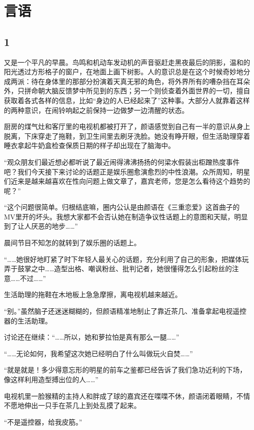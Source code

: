 \documentclass[UTF8, scheme = chinese, openany]{ctexbook}
\begin{document}
\section{言语}

\subsection{1}

又是一个平凡的早晨。鸟鸣和机动车发动机的声音驱赶走黑夜最后的阴影，温和的阳光透过方形格子的窗户，在地面上画下树影。人的意识总是在这个时候奇妙地分成两派：待在身体里的那部分扮演着天真无邪的角色，将外界所有的嘈杂挡在耳朵外，只拼命朝大脑反馈梦中所见到的东西；另一个则侦查着外面世界的一切，擅自获取着各式各样的信息，比如“身边的人已经起来了”这种事。大部分人就靠着这样的两种意识，在闹铃响起之前保持一边做梦一边清醒的状态。

厨房的煤气灶和客厅里的电视机都被打开了，颜语感觉到自己有一半的意识从身上脱离，下床穿走了拖鞋，到卫生间里去刷牙洗脸。她没有睁开眼，但生活助理穿着睡衣拿起牛奶盒检查保质日期的样子却出现在了脑海中。

“观众朋友们最近想必都听说了最近闹得沸沸扬扬的何梁水假装出柜蹭热度事件吧？我们今天接下来讨论的话题正是娱乐圈愈演愈烈的中性浪潮。众所周知，明星们近来是越来越喜欢在性向问题上做文章了，嘉宾老师，您是怎么看待这个趋势的呢？”

“这个问题很简单。归根结底嘛，圈内公认是由颜语在《三重恋爱》这首曲子的MV里开的坏头。我想大家都不会否认她在制造争议性话题上的意图和天赋，明显到了让人厌恶的地步……”

晨间节目不知怎的就转到了娱乐圈的话题上。

“……她很好地盯紧了时下年轻人最关心的话题，充分利用了自己的形象，把媒体玩弄于鼓掌之中……造型出格、嘲讽粉丝、批判记者，她很懂得怎么引起粉丝的注意……不过……”

生活助理的拖鞋在木地板上急急摩擦，离电视机越来越近。

“别。”虽然脑子还迷迷糊糊的，但颜语精准地制止了靠近茶几、准备拿起电视遥控器的生活助理。

讨论还在继续：“……所以，她和萝拉怕是真有那么一腿……”

“……无论如何，我希望这次她已经明白了什么叫做玩火自焚……”

“就是就是！多少得意忘形的明星的前车之鉴都已经告诉了我们急功近利的下场，像这样利用造型搏出位的人……”

电视机里一脸猴精的主持人和胖成了球的嘉宾还在喋喋不休，颜语闭着眼睛，不情不愿地伸出一只手在茶几上到处乱摸了起来。

“不是遥控器，给我皮筋。”
\end{document}
